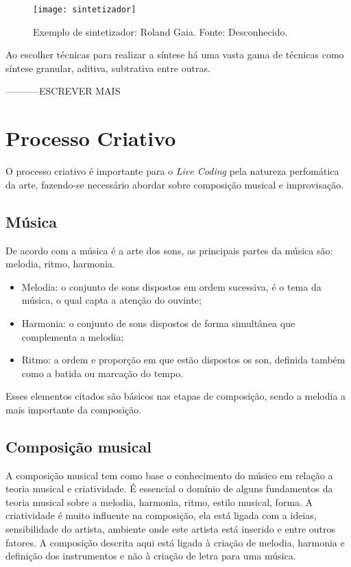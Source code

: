 \begin{figure}[!htb]
\centering
	\texttt{[image: sintetizador]}
	\caption{Exemplo de sintetizador: Roland Gaia. Fonte: Desconhecido.}
	\label{fig:sintetizador}
\end{figure}

Ao escolher técnicas para realizar a síntese há uma vasta gama de técnicas como síntese granular, aditiva, subtrativa entre outras.


-----------ESCREVER MAIS


\section{Processo Criativo}
O processo criativo é importante para o \textit{Live Coding} pela natureza perfomática da arte, fazendo-se necessário abordar sobre composição musical e improvisação.  

\subsection{Música}
De acordo com \cite{lacerda1966} a música é a arte dos sons, as principais partes da música são: melodia, ritmo, harmonia.

\begin{itemize}
	\item Melodia: o conjunto de sons dispostos em ordem sucessiva, é o tema da música, o qual capta a atenção do ouvinte;
	\item Harmonia: o conjunto de sons dispostos de forma simultânea que complementa a melodia;
	\item Ritmo: a ordem e proporção em que estão dispostos os son, definida também como a batida ou marcação do tempo.
\end{itemize} 

Esses elementos citados são básicos nas etapas de composição, sendo a melodia a mais importante da composição.

\subsection{Composição musical}
A composição musical tem como base o conhecimento do músico em relação a teoria musical e criatividade. É essencial o domínio de alguns fundamentos da teoria musical sobre a melodia, harmonia, ritmo, estilo musical, forma. A criatividade é muito influente na composição, ela está ligada com a ideias, sensibilidade do artista, ambiente onde este artista está inserido e entre outros fatores. A composição descrita aqui está ligada à criação de melodia, harmonia e definição dos instrumentos e não à criação de letra para uma música.  

